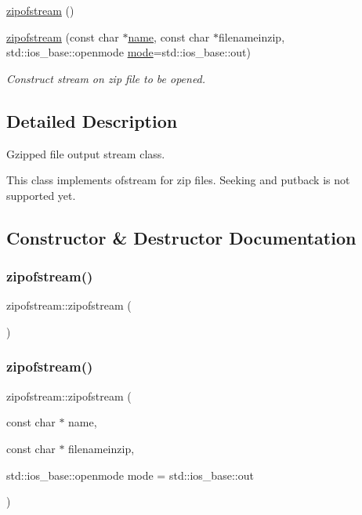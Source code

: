 \begin{DoxyCompactItemize}
\hyperlink{classzipofstream_a077927368c4ccdff182a5067842c9f3d}{zipofstream} ()
\item 
\hyperlink{classzipofstream_a16dbd32a8d0a903ec50eca19bdd11275}{zipofstream} (const char $\ast$\hyperlink{lp__lib_8h_a2946c588fc7fa2fa5b43ac54b7872725}{name}, const char $\ast$filenameinzip, std\+::ios\+\_\+base\+::openmode \hyperlink{ioapi_8h_ab77191763734fbb3e515371393ccb606}{mode}=std\+::ios\+\_\+base\+::out)
\begin{DoxyCompactList}\small\item\em Construct stream on zip file to be opened. \end{DoxyCompactList}\end{DoxyCompactItemize}


\subsection{Detailed Description}
Gzipped file output stream class. 

This class implements ofstream for zip files. Seeking and putback is not supported yet. 

\subsection{Constructor \& Destructor Documentation}
\mbox{\label{classzipofstream_a077927368c4ccdff182a5067842c9f3d}} 
\subsubsection{\texorpdfstring{zipofstream()}{zipofstream()}\hspace{0.1cm}{\footnotesize\ttfamily [1/2]}}
{\footnotesize\ttfamily zipofstream\+::zipofstream (\begin{DoxyParamCaption}{ }\end{DoxyParamCaption})}

\mbox{\label{classzipofstream_a16dbd32a8d0a903ec50eca19bdd11275}} 
\subsubsection{\texorpdfstring{zipofstream()}{zipofstream()}\hspace{0.1cm}{\footnotesize\ttfamily [2/2]}}
{\footnotesize\ttfamily zipofstream\+::zipofstream (\begin{DoxyParamCaption}\item[{const char $\ast$}]{name,  }\item[{const char $\ast$}]{filenameinzip,  }\item[{std\+::ios\+\_\+base\+::openmode}]{mode = {\ttfamily std\+:\+:ios\+\_\+base\+:\+:out} }\end{DoxyParamCaption})\hspace{0.3cm}{\ttfamily [explicit]}}



